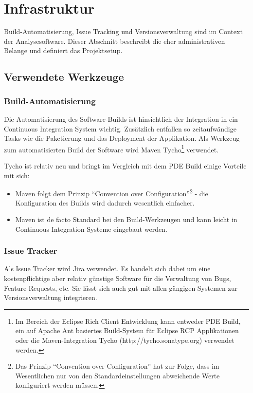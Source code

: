 \chapter{Infrastruktur}\label{konzept_3}
Build-Automatisierung, Issue Tracking und Versionsverwaltung sind im Context der Analysesoftware. Dieser Abschnitt beschreibt die eher administrativen Belange und definiert das Projektsetup. 

\section{Verwendete Werkzeuge}
\subsection{Build-Automatisierung}
Die Automatisierung des Software-Builds ist hinsichtlich der Integration in ein Continuous Integration System wichtig. Zusätzlich entfallen so zeitaufwändige Tasks wie die Paketierung und das Deployment der Applikation.
Als Werkzeug zum automatisierten Build der Software wird Maven Tycho\footnote{Im Bereich der Eclipse Rich Client Entwicklung kann entweder PDE Build, ein auf Apache Ant basiertes Build-System für Eclipse RCP Applikationen\cite{vogelZapfPdeBuild} oder die Maven-Integration Tycho (http://tycho.sonatype.org) verwendet werden.} verwendet.

Tycho ist relativ neu und bringt im Vergleich mit dem PDE Build einige Vorteile mit sich:
\begin{itemize}
	\item Maven folgt dem Prinzip ``Convention over Configuration''\footnote{Das Prinzip ``Convention over Configuration'' hat zur Folge, dass im Wesentlichen nur von den Standardeinstellungen abweichende Werte konfiguriert werden müssen.} - die Konfiguration des Builds wird dadurch wesentlich einfacher.
	\item Maven ist de facto Standard bei den Build-Werkzeugen und kann leicht in Continuous Integration Systeme eingebaut werden.
\end{itemize}

\subsection{Issue Tracker}\label{issue_tracker}
Als Issue Tracker wird Jira verwendet. Es handelt sich dabei um eine kostenpflichtige aber relativ günstige Software für die Verwaltung von Bugs, Feature-Requests, etc. Sie lässt sich auch gut mit allen gängigen Systemen zur Versionsverwaltung integrieren.

